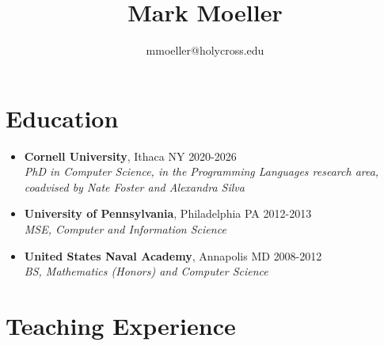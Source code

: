 \documentclass[11pt]{article}
\title{\huge Mark Moeller}
\date{}
\author{mmoeller@holycross.edu}
\begin{document}
\maketitle


\section*{Education}
\begin{itemize}
\item[] \textbf{Cornell University}, Ithaca NY \hfill{2020-2026}
\\{\em PhD in Computer Science, in the Programming Languages research area, coadvised by Nate Foster and Alexandra Silva}

\item[] \textbf{University of Pennsylvania}, Philadelphia PA \hfill{2012-2013}
\\{\em MSE, Computer and Information Science}

\item[] \textbf{United States Naval Academy}, Annapolis MD \hfill{2008-2012}
\\{\em BS, Mathematics (Honors) and Computer Science}
\end{itemize}


\section*{Teaching Experience}
\end{document}
